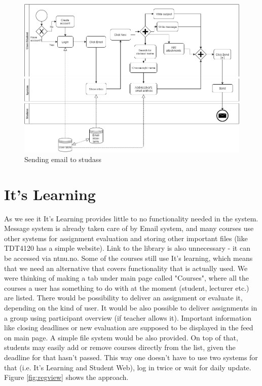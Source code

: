 \begin{figure}[h]
\centering
\includegraphics[width=\linewidth]{sec/Send_email_to_studass.png}
\caption{Sending email to studass}
\label{fig:email}
\end{figure}
\newpage

\section{It's Learning}
As we see it It's Learning provides little to no functionality needed in the system. Message system is already taken care of by Email system, and many courses use other systems for assignment evaluation and storing other important files (like TDT4120 has a simple website). Link to the library is also unnecessary - it can be accessed via ntnu.no. Some of the courses still use It's learning, which means that we need an alternative that covers functionality that is actually used. We were thinking of making a tab under main page called "Courses", where all  the courses a user has something to do with at the moment (student, lecturer etc.) are listed. There would be possibility to deliver an assignment or evaluate it, depending on the kind of user. It would be also possible to deliver assignments in a group using participant overview (if teacher allows it). Important information like closing deadlines or new evaluation are supposed to be displayed in the feed on main page. A simple file system would be also provided. On top of that, students may easily add or remove courses directly from the list, given the deadline for that hasn't passed. This way one doesn't have to use two systems for that (i.e. It's Learning and Student Web), log in twice or wait for daily update. Figure \ref{fig:regview} shows the approach.

